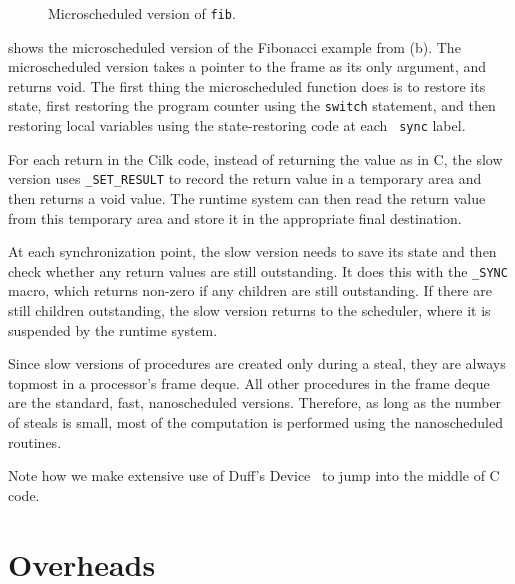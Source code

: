 \begin{figure}
{\footnotesize }
\caption{\small Microscheduled version of \texttt{fib}.}
\label{fig:microfib}
\end{figure}

 shows the microscheduled version of the Fibonacci
example from (b).  The microscheduled version takes a
pointer to the frame as its only argument, and returns void.  The
first thing the microscheduled function does is to restore its state,
first restoring the program counter using the {\tt switch} statement, and then
restoring local variables using the state-restoring code at each {\tt
sync} label.

For each return in the Cilk code, instead of returning the value as in
C, the slow version uses
\texttt{\_SET\_RESULT} to record the return value
in a temporary area and then returns a void value.  The runtime system
can then read the return value from this temporary area and store it in
the appropriate final destination.


At each synchronization point, the slow version needs to save its
state and then check whether
any return values are still outstanding.  It does this with the
\texttt{\_SYNC} macro, which returns
non-zero if any children are still outstanding.  If there are still
children outstanding, the slow version returns to the scheduler, where
it is suspended by the runtime system.

Since slow versions of procedures are created only during a steal,
they are always topmost in a processor's frame deque.  All other
procedures in the frame deque are the standard, fast, nanoscheduled
versions.  Therefore, as long as the number of steals is small, most
of the computation is performed using the nanoscheduled routines.

Note how we make extensive use of Duff's Device~\cite{Duff83} to jump into the middle of C code.

\section{Overheads}

